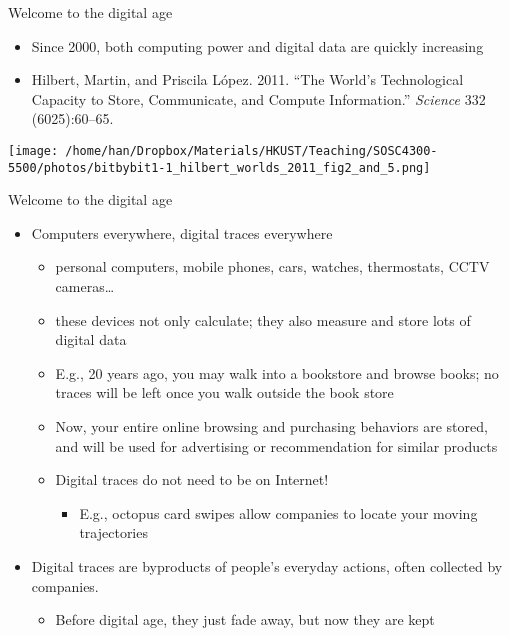 \documentclass[handout]{beamer}
\begin{document}
\begin{frame}[label={h:b8b84693-c471-48c6-b150-5457bf9e4d22}]{Welcome to the digital age}
\begin{itemize}
\item Since 2000, both computing power and digital data are quickly increasing
\item Hilbert, Martin, and Priscila López. 2011. “The World’s Technological Capacity to Store, Communicate, and Compute Information.” \emph{Science} 332 (6025):60–65.
\end{itemize}

\begin{center}
\texttt{[image: /home/han/Dropbox/Materials/HKUST/Teaching/SOSC4300-5500/photos/bitbybit1-1\_hilbert\_worlds\_2011\_fig2\_and\_5.png]}
\end{center}
\end{frame}
\begin{frame}[label={h:9ff4f276-ee5c-4ab7-9244-cb15e73ee349}]{Welcome to the digital age}
\begin{itemize}
\item Computers everywhere, \alert{digital traces} everywhere
\begin{itemize}
\item personal computers, mobile phones, cars, watches, thermostats, CCTV cameras\ldots{}
\item these devices not only \alert{calculate}; they also \alert{measure} and \alert{store} lots of digital data
\item E.g., 20 years ago, you may walk into a bookstore and browse books; no traces will be left once you walk outside the book store
\item Now, your entire online browsing and purchasing behaviors are stored, and will be used for advertising or recommendation for similar products
\item Digital traces do not need to be on Internet!
\begin{itemize}
\item E.g., octopus card swipes allow companies to locate your moving trajectories
\end{itemize}
\end{itemize}
\item \alert{Digital traces} are byproducts of people’s everyday actions, often collected by companies.
\begin{itemize}
\item Before digital age, they just fade away, but now they are kept
\end{itemize}
\end{itemize}
\end{frame}
\end{document}
